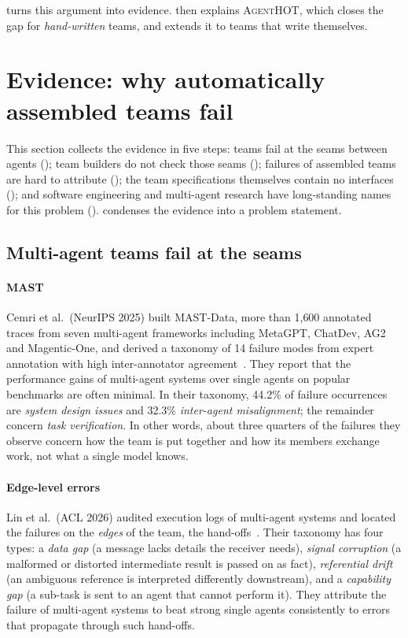 \documentclass[10pt,a4paper]{article}
\newcommand{\tool}{\textsc{AgentHOT}}
\begin{document}
 turns this argument into evidence. 
then explains \tool{}, which closes the gap for \emph{hand-written} teams,
and  extends it to teams that write themselves.
\section{Evidence: why automatically assembled teams fail}\label{sec:evidence}

This section collects the evidence in five steps: teams fail at the seams
between agents (); team builders do not check those seams
(); failures of assembled teams are hard to attribute
(); the team specifications themselves contain no
interfaces (); and software engineering and multi-agent
research have long-standing names for this problem ().
 condenses the evidence into a problem statement.

\subsection{Multi-agent teams fail at the seams}\label{sec:ev-seams}

\paragraph{MAST} Cemri et al.\ (NeurIPS 2025) built MAST-Data, more than
1{,}600 annotated traces from seven multi-agent frameworks including
MetaGPT, ChatDev, AG2 and Magentic-One, and derived a taxonomy of 14
failure modes from expert annotation with high inter-annotator
agreement~\cite{cemri2025mast}. They report that the performance gains of
multi-agent systems over single agents on popular benchmarks are often
minimal. In their taxonomy, 44.2\% of failure occurrences are \emph{system
design issues} and 32.3\% \emph{inter-agent misalignment}; the remainder
concern \emph{task verification}. In other words, about three quarters of
the failures they observe concern how the team is put together and how its
members exchange work, not what a single model knows.

\paragraph{Edge-level errors} Lin et al.\ (ACL 2026) audited execution logs
of multi-agent systems and located the failures on the \emph{edges} of the
team, the hand-offs~\cite{lin2026agentask}. Their taxonomy has four types:
a \emph{data gap} (a message lacks details the receiver needs),
\emph{signal corruption} (a malformed or distorted intermediate result is
passed on as fact), \emph{referential drift} (an ambiguous reference is
interpreted differently downstream), and a \emph{capability gap} (a
sub-task is sent to an agent that cannot perform it). They attribute the
failure of multi-agent systems to beat strong single agents consistently
to errors that propagate through such hand-offs.
\end{document}

